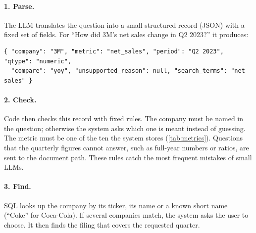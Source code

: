 \paragraph{1. Parse.} The LLM translates the question into a small structured record (JSON) with a
fixed set of fields. For ``How did 3M's net sales change in Q2 2023?'' it produces:

\noindent\begin{minipage}{\linewidth}
\begin{lstlisting}
{ "company": "3M", "metric": "net_sales", "period": "Q2 2023", "qtype": "numeric",
  "compare": "yoy", "unsupported_reason": null, "search_terms": "net sales" }
\end{lstlisting}
\end{minipage}

\paragraph{2. Check.} Code then checks this record with fixed rules. The company must be named in
the question; otherwise the system asks which one is meant instead of guessing. The metric must be
one of the ten the system stores (\cref{tab:metrics}). Questions that the quarterly figures cannot
answer, such as full-year numbers or ratios, are sent to the document path. These rules catch the
most frequent mistakes of small LLMs.

\paragraph{3. Find.} SQL looks up the company by its ticker, its name or a known short name (``Coke''
for Coca-Cola). If several companies match, the system asks the user to choose. It then finds the
filing that covers the requested quarter.

